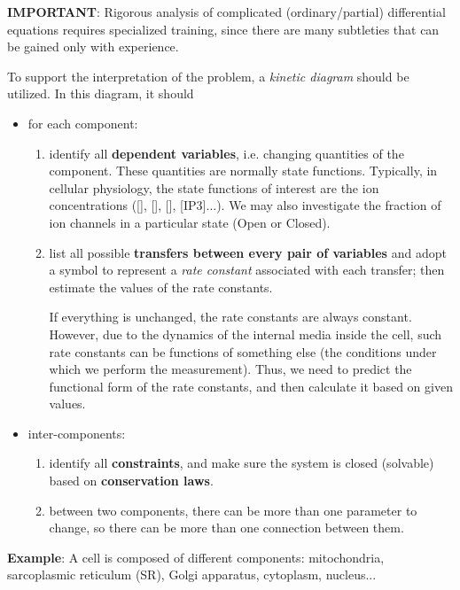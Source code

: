 {\bf IMPORTANT}: Rigorous analysis of complicated (ordinary/partial)
differential equations requires specialized training, since there are
many subtleties that can be gained only with experience.

To support the interpretation of the problem, a {\it kinetic diagram}
should be utilized. In this diagram, it should

\begin{itemize}
\item for each component:
  \begin{enumerate}
  \item identify all {\bf dependent variables}, i.e.  changing
    quantities of the component. These quantities are normally state
    functions. Typically, in cellular physiology, the state functions
    of interest are the ion concentrations ([], [],
    [], [IP3]...). We may also investigate the fraction of ion channels
    in a particular state (Open or Closed).
  \item list all possible
    {\bf transfers between every pair of variables} and adopt a symbol
    to represent a {\it rate constant} associated with each transfer;
    then estimate the values of the rate constants. 
    
    If everything is unchanged, the rate constants are always constant. However,
    due to the dynamics of the internal media inside the cell, such rate
    constants can be functions of something else (the conditions under which we
    perform the measurement). Thus, we need to predict the functional form of
    the rate constants, and then calculate it based on given values.
  \end{enumerate}

\item inter-components:
  \begin{enumerate}
  \item identify all {\bf constraints}, and make sure the system is
    closed (solvable) based on {\bf conservation laws}. 
    
  \item between two components, there can be more than one parameter to
    change, so there can be more than one connection between them. 
  \end{enumerate}
\end{itemize}

{\bf Example}: A cell is composed of different components:
mitochondria, sarcoplasmic reticulum (SR), Golgi apparatus, cytoplasm,
nucleus...

